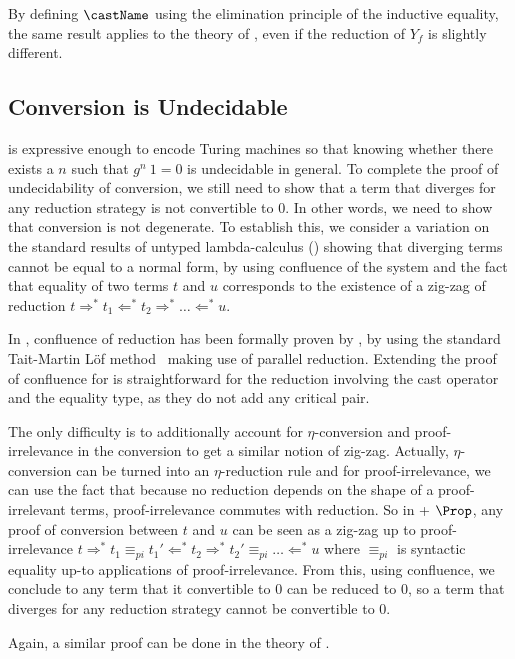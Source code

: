   
  By defining $\castName$ using the elimination principle of the
  inductive equality, the same result applies to the
  theory of , even if the reduction of $Y_f$ is
  slightly different.
  
  \subsection{Conversion is Undecidable}
  
  \SetoidCC is expressive enough to encode Turing machines so that
  knowing whether there exists a \( n \) such that \( g^n\ 1 = 0 \) is
  undecidable in general.
  To complete the proof of undecidability of conversion, we still need
  to show that a term that diverges for any reduction strategy is not
  convertible to $0$. In other words, we need to show that conversion is
  not degenerate.
  To establish this, we consider a variation on the standard results of untyped
  lambda-calculus () showing that diverging terms
  cannot be equal to a normal form, by using confluence of the system
  and the fact that equality of two terms $t$ and $u$ corresponds to the
  existence of a zig-zag of reduction $t \Rightarrow^* t_1 \Leftarrow^*
  t_2\Rightarrow^*\dots \Leftarrow^* u$.
  
  In \CIC, confluence of reduction has been formally proven by
  , by using the standard Tait-Martin Löf
  method~ making use of parallel
  reduction.
  Extending the proof of confluence for \SetoidCC is straightforward for
  the reduction involving the cast operator and the equality type, as
  they do not add any critical pair.
  
  The only difficulty is to additionally account for $\eta$-conversion
  and proof-irrelevance in the conversion to get a similar notion of
  zig-zag.
  Actually, $\eta$-conversion can be turned into an
  $\eta$-reduction rule and for proof-irrelevance, we can use the fact
  that because no reduction depends on the shape of a proof-irrelevant
  terms, proof-irrelevance commutes with reduction.
  So in \SetoidCC + $\Prop$, any proof of conversion between $t$ and $u$
  can be seen as a zig-zag up to proof-irrelevance
  $t \Rightarrow^* t_1 \equiv_{pi} t_1' \Leftarrow^*
  t_2\Rightarrow ^* t_2' \equiv_{pi} \dots \Leftarrow^* u$ where $\equiv_{pi}$ is syntactic
  equality up-to applications of proof-irrelevance.
  From this, using confluence, we conclude to any term that it convertible to $0$ can be
  reduced to $0$, so a term that diverges for any reduction strategy
  cannot be convertible to $0$.
  
  Again, a similar proof can be done in the theory of .